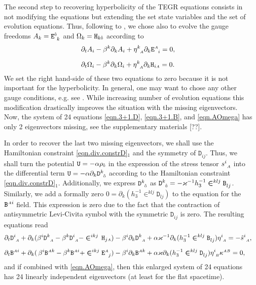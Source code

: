 \documentclass[
10pt, %
a4paper, %
oneside, %
headinclude,footinclude, %
BCOR5mm, %
]{scrartcl}
\newcommand{\sA}{\mathsmaller A}
\newcommand{\sB}{\mathsmaller B}
\newcommand{\pd}[1]{\partial_{#1}}
\newcommand{\MG}[1]{\kappa^{#1}}			%
\newcommand{\tetrsymbol}{h}
\newcommand{\itetrsymbol}{\eta}
\newcommand{\itetr}[2]{\itetrsymbol^{#1}_{\phantom{#1}#2}}
\newcommand{\stress}[2]{s_{\ #1}^{#2}}
\newcommand{\stressalt}[2]{\hat{s}_{\ #1}^{#2}}
\newcommand{\detTetr}{\tetrsymbol}
\newcommand{\Dfin}[2]{\mathtt{D}_{\phantom{#2}#1}^{#2}}	%
\newcommand{\Hfin}[2]{\mathtt{H}_{#2#1}}	%
\newcommand{\Efin}[2]{\mathtt{E}^{#1}_{\phantom{#1}#2}}	%
\newcommand{\Ufin}{\mathtt{U}}
\newcommand{\Bfin}[2]{\mathtt{B}^{#1#2}}	%
\newcommand{\Bfinmix}[2]{\mathtt{B}^{#1}_{\phantom{#1}#2}}	%
\newcommand{\LCsymb}{\bm{\in}}    %
\newcommand{\indalg}[1]{\hat{\mathsmaller{#1}}}
\newcommand{\lapse}{\alpha}
\newcommand{\shift}[1]{\beta^{#1}}
\begin{document}
The second step to recovering hyperbolicity of the TEGR equations consists in not modifying the 
equations but extending the set state variables and the set of evolution equations.
Thus, following to \cite{Estabrook1997,Buchman2003}, we chose also to evolve the gauge freedoms $ A_k = 
\Efin{\indalg{0}}{k} $ and $ \Omega_k = \Hfin{\indalg{0}}{k} $ according to
\begin{subequations}\label{eqn.AOmega}
	\begin{align}
		&\pd{t}A_i - \shift{k}\pd{k}A_i + \itetr{k}{\sA} \pd{k} \Efin{\sA}{i} = 0, 
		\\[2mm]
		&\pd{t}\Omega_i -\shift{k}\pd{k}\Omega_i + \itetr{k}{\sA} \pd{k} \Hfin{\sA}{i} = 0.
	\end{align}
\end{subequations}
We set the right hand-side of these two equations to zero because it is not important for the 
hyperbolicity. In general, one may want to chose any other gauge conditions, e.g. see 
\cite{Buchman2003}. While increasing number of evolution equations this modification drastically 
improves the situation with the missing eigenvectors. Now, the system of 24 equations 
\eqref{eqn.3+1.D}, 
\eqref{eqn.3+1.B}, and \eqref{eqn.AOmega} has only 2 eigenvectors missing, see the supplementary 
materials [??].

In order to recover the last two missing eigenvectors, we shall use the Hamiltonian constraint 
\eqref{eqn.div.constrD}$ _1 $ and the symmetry of $ \Dfin{ij}{} $. Thus, we shall turn the potential $ 
\Ufin =-\lapse \rho_{\indalg{0}} $ in the expression of the stress tensor $ \stress{\sA}{i} $ 
into the 
differential term $ \Ufin =-\lapse \pd{k}\Dfin{\indalg{0}}{k} $ according to the Hamiltonian constraint 
\eqref{eqn.div.constrD}$ _1 $. Additionally, we express $ 
\Dfin{\indalg{0}}{k} $ as $  \Dfin{\indalg{0}}{k} = -\varkappa^{-1}\detTetr_3^{-1} 
\LCsymb^{klj}\Bfinmix{}{lj}$. Similarly, we add a formally zero $ 0 = \pd{k}(\detTetr_3^{-1} 
\LCsymb^{klj} \Dfin{lj}{}) $ to the equation for the $ \Bfin{\sA}{i} $ field. This expression is zero 
due to the fact that the contraction of antisymmetric Levi-Civita symbol with the symmetric $ 
\Dfin{ij}{} $ is zero. The resulting equations read
\begin{subequations}\label{eqn.BD.alt2}
	\begin{align}
		\pd{t} \Dfin{\sA}{i} + \pd{k}(\shift{i} 
		\Dfin{\sA}{k} - \shift{k}\Dfin{\sA}{i}  - \LCsymb^{ikj} \,
		\Hfin{\sA}{j}) 
		-\shift{i}\pd{k} \Dfin{\sA}{k}
		&
		+\lapse \varkappa^{-1}\pd{k}(\detTetr_3^{-1} \LCsymb^{klj} \Bfinmix{}{lj}) 
		\itetr{i}{\sA}
		= - \stressalt{\sA}{i},
		\label{eqn.BD.alt2.D}
		\\[2mm]
		\pd{t} \Bfin{\sA}{i} + \pd{k}(\,\shift{i} 
		\Bfin{\sA}{k} - \shift{k}\Bfin{\sA}{i}  + \LCsymb^{ikj} 
		\Efin{\sA}{j}) 
		-\shift{i}\pd{k} \Bfin{\sA}{k}
		&
		+\lapse \varkappa\pd{k}(\detTetr_3^{-1} \LCsymb^{klj} \Dfin{lj}{}) 
		\itetr{i}{\sB} \MG{\sA\sB}
		= 0,
		\label{eqn.BD.alt2.B}
	\end{align}
\end{subequations}
and if combined with \eqref{eqn.AOmega}, then this enlarged system of 24 equations has 24 linearly 
independent eigenvectors (at least for the flat spacetime).
\end{document}
